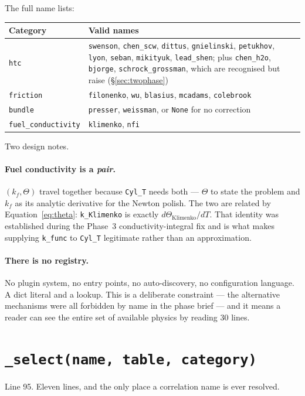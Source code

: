 \documentclass[11pt]{article}
\newcommand{\code}[1]{\texttt{#1}}
\begin{document}
The full name lists:

\begin{center}
\begin{tabular}{lp{9.4cm}}
\toprule
Category & Valid names \\
\midrule
\code{htc} & \code{swenson}, \code{chen\_scw}, \code{dittus}, \code{gnielinski},
\code{petukhov}, \code{lyon}, \code{seban}, \code{mikityuk}, \code{lead\_shen}; plus
\code{chen\_h2o}, \code{bjorge}, \code{schrock\_grossman}, which are recognised but
raise (\S\ref{sec:twophase}) \\
\code{friction} & \code{filonenko}, \code{wu}, \code{blasius}, \code{mcadams},
\code{colebrook} \\
\code{bundle} & \code{presser}, \code{weissman}, or \code{None} for no correction \\
\code{fuel\_conductivity} & \code{klimenko}, \code{nfi} \\
\bottomrule
\end{tabular}
\end{center}

Two design notes.

\paragraph{Fuel conductivity is a \emph{pair}.} $(k_f, \Theta)$ travel together because
\code{Cyl\_T} needs both --- $\Theta$ to state the problem and $k_f$ as its analytic
derivative for the Newton polish. The two are related by
Equation~\eqref{eq:theta}: \code{k\_Klimenko} is exactly $d\Theta_{\text{Klimenko}}/dT$.
That identity was established during the Phase~3 conductivity-integral fix and is what
makes supplying \code{k\_func} to \code{Cyl\_T} legitimate rather than an approximation.

\paragraph{There is no registry.} No plugin system, no entry points, no
auto-discovery, no configuration language. A dict literal and a lookup. This is a
deliberate constraint --- the alternative mechanisms were all forbidden by name in the
phase brief --- and it means a reader can see the entire set of available physics by
reading 30 lines.

\section{\code{\_select(name, table, category)}}
Line 95. Eleven lines, and the only place a correlation name is ever resolved.
\end{document}
